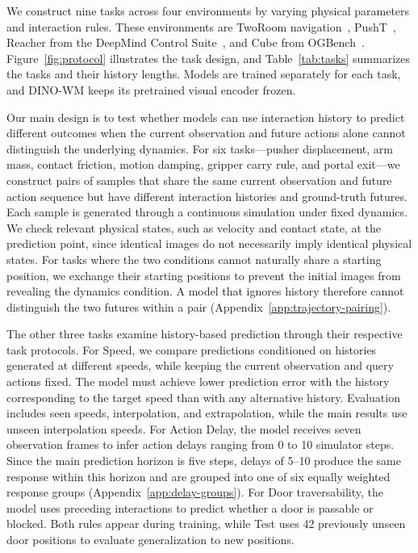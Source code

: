We construct nine tasks across four environments by varying physical parameters and interaction rules.
These environments are TwoRoom navigation~\cite{zhou2025dinowm}, PushT~\cite{chi2023diffusionpolicy}, Reacher from the DeepMind Control Suite~\cite{tassa2018control}, and Cube from OGBench~\cite{park2025ogbench}.
Figure~\ref{fig:protocol} illustrates the task design, and Table~\ref{tab:tasks} summarizes the tasks and their history lengths.
Models are trained separately for each task, and DINO-WM keeps its pretrained visual encoder frozen.

Our main design is to test whether models can use interaction history to predict different outcomes when the current observation and future actions alone cannot distinguish the underlying dynamics.
For six tasks---pusher displacement, arm mass, contact friction, motion damping, gripper carry rule, and portal exit---we construct pairs of samples that share the same current observation and future action sequence but have different interaction histories and ground-truth futures.
Each sample is generated through a continuous simulation under fixed dynamics.
We check relevant physical states, such as velocity and contact state, at the prediction point, since identical images do not necessarily imply identical physical states.
For tasks where the two conditions cannot naturally share a starting position, we exchange their starting positions to prevent the initial images from revealing the dynamics condition.
A model that ignores history therefore cannot distinguish the two futures within a pair (Appendix~\ref{app:trajectory-pairing}).

The other three tasks examine history-based prediction through their respective task protocols.
For Speed, we compare predictions conditioned on histories generated at different speeds, while keeping the current observation and query actions fixed.
The model must achieve lower prediction error with the history corresponding to the target speed than with any alternative history.
Evaluation includes seen speeds, interpolation, and extrapolation, while the main results use unseen interpolation speeds.
For Action Delay, the model receives seven observation frames to infer action delays ranging from 0 to 10 simulator steps.
Since the main prediction horizon is five steps, delays of 5--10 produce the same response within this horizon and are grouped into one of six equally weighted response groups (Appendix~\ref{app:delay-groups}).
For Door traversability, the model uses preceding interactions to predict whether a door is passable or blocked.
Both rules appear during training, while Test uses 42 previously unseen door positions to evaluate generalization to new positions.

